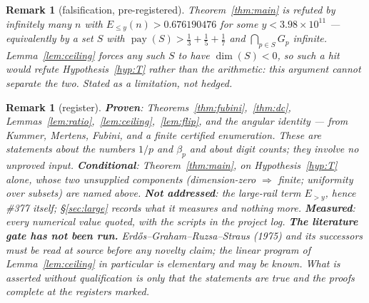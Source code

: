 \documentclass[11pt]{article}
\newtheorem{remark}[theorem]{Remark}
\begin{document}
\begin{remark}[falsification, pre-registered]
Theorem~\ref{thm:main} is refuted by infinitely many $n$ with
$E_{\le y}(n)>0.676190476$ for some $y<3.98\times10^{11}$ --- equivalently by a
set $S$ with $\operatorname{pay}(S)>\frac13+\frac15+\frac17$ and
$\bigcap_{p\in S}G_p$ infinite.  Lemma~\ref{lem:ceiling} forces any such $S$ to
have $\dim(S)<0$, so such a hit would refute Hypothesis~\ref{hyp:T} rather than
the arithmetic: this argument cannot separate the two.  Stated as a limitation,
not hedged.
\end{remark}

\begin{remark}[register]
\textbf{Proven}: Theorems~\ref{thm:fubini},~\ref{thm:dc},
Lemmas~\ref{lem:ratio},~\ref{lem:ceiling},~\ref{lem:flip}, and the angular
identity --- from Kummer, Mertens, Fubini, and a finite certified enumeration.
These are statements about the numbers $1/p$ and $\beta_p$ and about digit
counts; they involve no unproved input.  \textbf{Conditional}:
Theorem~\ref{thm:main}, on Hypothesis~\ref{hyp:T} alone, whose two unsupplied
components (dimension-zero $\Rightarrow$ finite; uniformity over subsets) are
named above.  \textbf{Not addressed}: the large-rail term $E_{>y}$, hence
\#377 itself; \S\ref{sec:large} records what it measures and nothing more.
\textbf{Measured}: every numerical value quoted,
with the scripts in the project log.  \textbf{The literature gate has not been
run.}  Erd\H{o}s--Graham--Ruzsa--Straus (1975) and its successors must be read
at source before any novelty claim; the linear program of
Lemma~\ref{lem:ceiling} in particular is elementary and may be known.  What is
asserted without qualification is only that the statements are true and the
proofs complete at the registers marked.
\end{remark}
\end{document}
